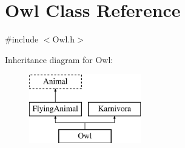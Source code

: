 \hypertarget{classOwl}{\section{Owl Class Reference}
\label{classOwl}
}


{\ttfamily \#include $<$Owl.\-h$>$}

Inheritance diagram for Owl\-:\begin{figure}[H]
\begin{center}
\leavevmode
\includegraphics[height=3.000000cm]{classOwl}
\end{center}
\end{figure}
